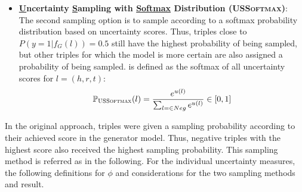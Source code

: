 \begin{itemize}
    \item
    \textbf{\underline{U}ncertainty \underline{S}ampling with \underline{Softmax} Distribution (\textsc{USSoftmax})}:\\
    
    The second sampling option is to sample according to a softmax probability distribution based on uncertainty scores.
    Thus, triples close to $P(y = 1 | f_G(l)) = 0.5$ still have the highest probability of being sampled, but other triples for which the model is more certain are also assigned a probability of being sampled.
    \ussoftmax is defined as the softmax of all uncertainty scores for $l = (h,r,t)$:
    \begin{equation}
        \label{eq:ussoftmax}
        \mathbb{P}_{\textsc{USSoftmax}}(l) = \frac{e^{u(l)}}{\sum_{l = \in Neg}{e^{u(l)}}} \in [0,1]
    \end{equation}
\end{itemize}
In the original \kbgan approach, triples were given a sampling probability according to their achieved score in the generator model.
Thus, negative triples with the highest score also received the highest sampling probability.
This sampling method is referred as \origsampling in the following.
For the individual uncertainty measures, the following definitions for $\phi$ and considerations for the two sampling methods \usmax and \ussoftmax result.


